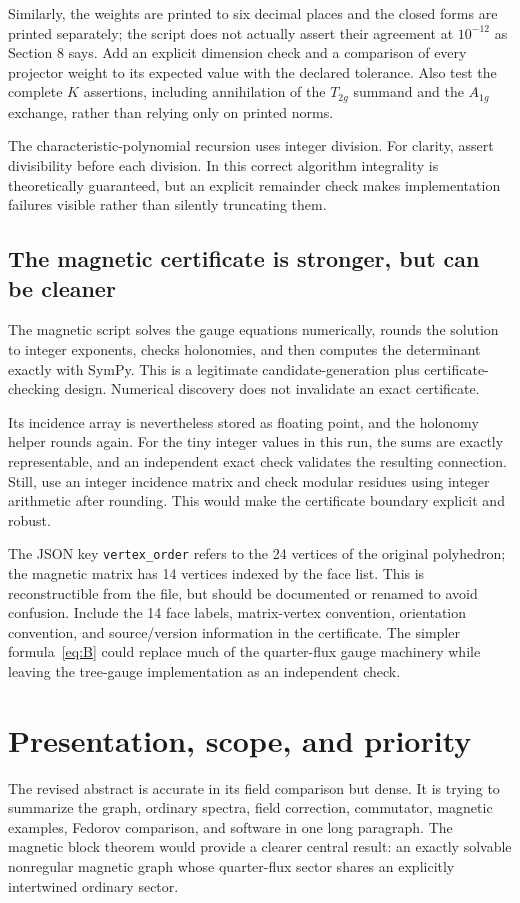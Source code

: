\documentclass[11pt,a4paper]{article}
\begin{document}
Similarly, the weights are printed to six decimal places and the closed forms are printed separately; the script does not actually assert their agreement at $10^{-12}$ as Section 8 says. Add an explicit dimension check and a comparison of every projector weight to its expected value with the declared tolerance. Also test the complete $K$ assertions, including annihilation of the $T_{2g}$ summand and the $A_{1g}$ exchange, rather than relying only on printed norms.

The characteristic-polynomial recursion uses integer division. For clarity, assert divisibility before each division. In this correct algorithm integrality is theoretically guaranteed, but an explicit remainder check makes implementation failures visible rather than silently truncating them.

\subsection{The magnetic certificate is stronger, but can be cleaner}
The magnetic script solves the gauge equations numerically, rounds the solution to integer exponents, checks holonomies, and then computes the determinant exactly with SymPy. This is a legitimate candidate-generation plus certificate-checking design. Numerical discovery does not invalidate an exact certificate.

Its incidence array is nevertheless stored as floating point, and the holonomy helper rounds again. For the tiny integer values in this run, the sums are exactly representable, and an independent exact check validates the resulting connection. Still, use an integer incidence matrix and check modular residues using integer arithmetic after rounding. This would make the certificate boundary explicit and robust.

The JSON key \texttt{vertex\_order} refers to the 24 vertices of the original polyhedron; the magnetic matrix has 14 vertices indexed by the face list. This is reconstructible from the file, but should be documented or renamed to avoid confusion. Include the 14 face labels, matrix-vertex convention, orientation convention, and source/version information in the certificate. The simpler formula~\eqref{eq:B} could replace much of the quarter-flux gauge machinery while leaving the tree-gauge implementation as an independent check.

\section{Presentation, scope, and priority}
The revised abstract is accurate in its field comparison but dense. It is trying to summarize the graph, ordinary spectra, field correction, commutator, magnetic examples, Fedorov comparison, and software in one long paragraph. The magnetic block theorem would provide a clearer central result: an exactly solvable nonregular magnetic graph whose quarter-flux sector shares an explicitly intertwined ordinary sector.
\end{document}
